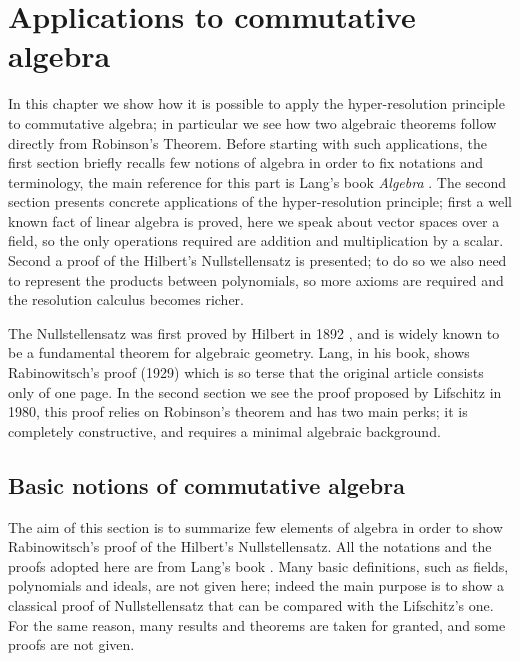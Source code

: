 \documentclass[a4paper,12pt,oneside]{book}
\begin{document}
\chapter{Applications to commutative algebra}
In this chapter we show how it is possible to apply the hyper-resolution principle to commutative algebra; in particular we see how two algebraic theorems follow directly from Robinson's Theorem. Before starting with such applications, the first section briefly recalls few notions of algebra in order to fix notations and terminology, the main reference for this part is Lang's book \textit{Algebra} \cite{Lang}.
The second section presents concrete applications of the hyper-resolution principle; first a  well known fact of linear algebra is proved, here we speak about vector spaces over a field, so the only operations required are addition and multiplication by a scalar. 
Second a proof of the Hilbert's Nullstellensatz is presented; to do so we also need to represent the products between polynomials, so more axioms are required and the resolution calculus becomes richer.

The Nullstellensatz was first proved by Hilbert \cite{Hilbert} in 1892 , and is widely known to be a fundamental theorem for algebraic geometry. Lang, in his book,  shows Rabinowitsch's proof (1929) which is so terse that the original article \cite{Rabin} consists only of one page. 
In the second section we see the proof proposed by Lifschitz \cite{lifschitz} in 1980, this proof relies on Robinson's theorem and has two main perks; it is completely constructive, and requires a minimal algebraic background. 




\section{Basic notions of commutative algebra}
The aim of this section is to summarize few elements of algebra in order to show  Rabinowitsch's proof of the Hilbert's Nullstellensatz. All the notations and the proofs adopted here are from Lang's book \cite{Lang}. Many basic definitions, such as fields, polynomials and ideals, are not given here; indeed the main purpose is to show a classical proof of Nullstellensatz that can be compared with the Lifschitz's one.
For the same reason, many results and theorems are taken for granted, and some proofs are not given.



\end{document}
